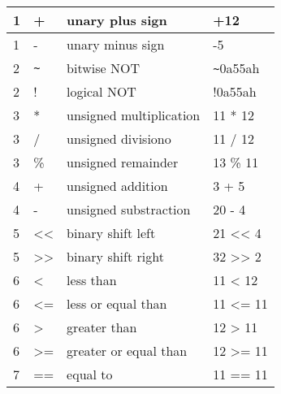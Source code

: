 \begin{table}[h!]
\begin{tabular}{|l|l|l|l|}
                        1              &          +           & unary plus sign              & +12                  \\\hline
                        1              &          -           & unary minus sign             & -5                   \\\hline
                        2              &           \verb'~'         & bitwise NOT                       & \verb'~'0a55ah                \\\hline
                        2              &           !         & logical NOT                      & !0a55ah               \\\hline
                        3              &           *            & unsigned multiplication       & 11 * 12               \\\hline
                        3              &           /            & unsigned divisiono            & 11 / 12               \\\hline
                        3              &           \%           & unsigned remainder            & 13 \% 11              \\\hline
                        4              &           +            & unsigned addition             & 3 + 5                 \\\hline
                        4              &           -            & unsigned substraction         & 20 - 4                \\\hline
                        5              &           <<           & binary shift left             & 21 << 4               \\\hline
                        5              &           >>           & binary shift right            & 32 >> 2               \\\hline
                        6              &           <          & less than                    & 11 < 12              \\\hline
                        6              &           <=         & less or equal than           & 11 <= 11             \\\hline
                        6              &            >         & greater than                 & 12 > 11              \\\hline
                        6              &           >=         & greater or equal than        & 12 >= 11             \\\hline
                        7              &           ==         & equal to                     & 11 == 11             \\\hline

\end{tabular}
\end{table}
